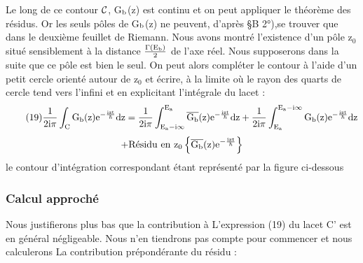 Le long de ce contour $\mathcal{C}$, G$_{\text{b}}$(z) est continu et on peut appliquer
le théorème des résidus. Or les seuls pôles de G$_{\text{b}}$(z) ne peuvent, d'après
\S B 2°),se trouver que dans le deuxième feuillet de Riemann. Nous avons montré
l'existence d'un pôle z$_0$ situé sensiblement à la distance $\frac{\Gamma(\text{E}_{\text{b}})}{2}$ de l'axe réel.
Nous supposerons dans la suite que ce pôle est bien le seul. On peut alors compléter le contour  à l'aide d'un petit cercle orienté autour de z$_0$ et
écrire, à la limite où le rayon des quarts de cercle tend vers l'infini et
en explicitant l'intégrale du lacet :
\[
\tag{19} \frac{1}{2\text{i}\pi}\int_{\text{C}}\text{G}_{\text{b}}\text{(z)}\text{e}^{-\frac{\text{izt}}{\hbar}}\text{dz} =
\frac{1}{2\text{i}\pi}\int_{\text{E}_{\text{a}}-\text{i}\infty}^{\text{E}_{\text{a}}}\overline{\text{G}_{\text{b}}}\text{(z)}\text{e}^{-\frac{\text{izt}}{\hbar}}\text{dz} +
\frac{1}{2\text{i}\pi}\int_{\text{E}_{\text{a}}}^{\text{E}_{\text{a}}-\text{i}\infty}\text{G}_{\text{b}}\text{(z)}\text{e}^{-\frac{\text{izt}}{\hbar}}\text{dz}
\]
\[
+\text{Résidu en z}_0 \left \{ \overline{\text{G}_{\text{b}}}\text{(z)}\text{e}^{-\frac{\text{izt}}{\hbar}} \right \}
\]
le contour d'intégration correspondant étant représenté par la figure ci-dessous
\begin{center}  \end{center}
\subsubsection{Calcul approché} %

Nous justifierons plus bas que la contribution à L'expression (19) du lacet C' est en général négligeable. Nous n'en tiendrons pas
compte pour commencer et nous calculerons La contribution prépondérante du
résidu :


